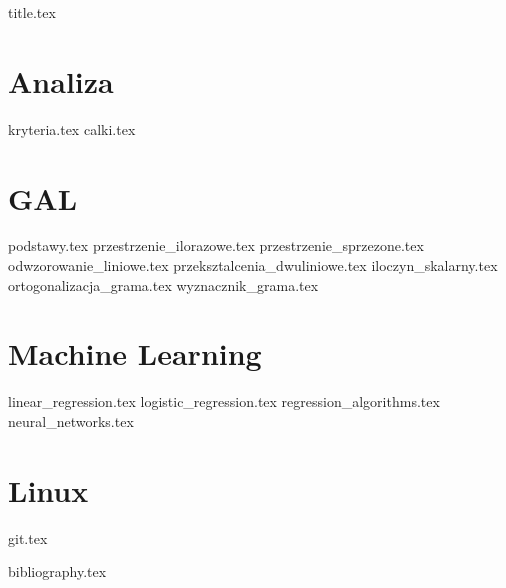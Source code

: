 \documentclass[a4paper,11pt]{book}
\begin{document}

\frontmatter
{title.tex}

\clearpage
\thispagestyle{empty}

\tableofcontents

\mainmatter

\chapter{Analiza}
{kryteria.tex}
{calki.tex}

\chapter{GAL}
{podstawy.tex}
{przestrzenie_ilorazowe.tex}
{przestrzenie_sprzezone.tex}
{odwzorowanie_liniowe.tex}
{przeksztalcenia_dwuliniowe.tex}
{iloczyn_skalarny.tex}
{ortogonalizacja_grama.tex}
{wyznacznik_grama.tex}

\chapter{Machine Learning}
{linear_regression.tex}
{logistic_regression.tex}
{regression_algorithms.tex}
{neural_networks.tex}

\chapter{Linux}
{git.tex}

\backmatter

{bibliography.tex}
\end{document}
